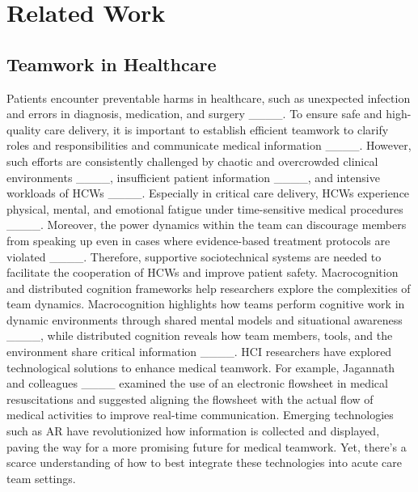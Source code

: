 \section{Related Work}
\subsection{Teamwork in Healthcare}

Patients encounter preventable harms in healthcare, such as unexpected infection and errors in diagnosis, medication, and surgery ____. 
To ensure safe and high-quality care delivery, it is important to establish efficient teamwork to clarify roles and responsibilities and communicate medical information ____. 
However, such efforts are consistently challenged by chaotic and overcrowded clinical environments ____, insufficient patient information ____, and intensive workloads of HCWs ____. 
Especially in critical care delivery, HCWs experience physical, mental, and emotional fatigue under time-sensitive medical procedures ____. 
Moreover, the power dynamics within the team can discourage members from speaking up even in cases where evidence-based treatment protocols are violated ____.
Therefore, supportive sociotechnical systems are needed to facilitate the cooperation of HCWs and improve patient safety.
Macrocognition and distributed cognition frameworks help researchers explore the complexities of team dynamics. Macrocognition highlights how teams perform cognitive work in dynamic environments through shared mental models and situational awareness ____, while distributed cognition reveals how team members, tools, and the environment share critical information ____.
HCI researchers have explored technological solutions to enhance medical teamwork. 
For example, Jagannath and colleagues ____ examined the use of an electronic flowsheet in medical resuscitations and suggested aligning the flowsheet with the actual flow of medical activities to improve real-time communication. 
Emerging technologies such as AR have revolutionized how information is collected and displayed, paving the way for a more promising future for medical teamwork. 
Yet, there’s a scarce understanding of how to best integrate these technologies into acute care team settings.



